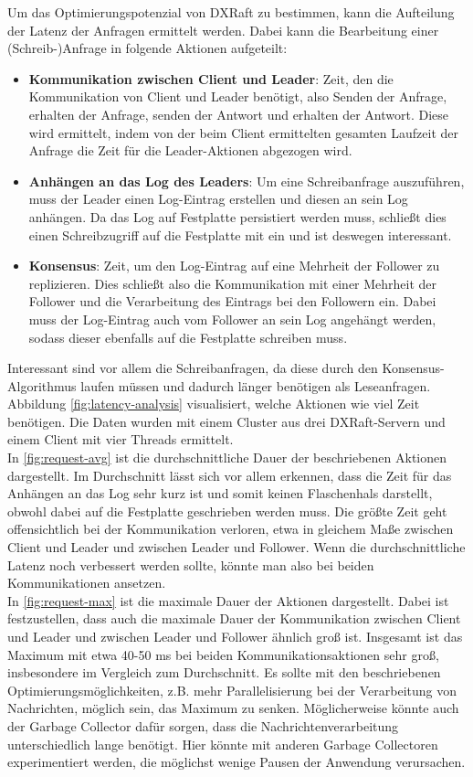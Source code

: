 Um das Optimierungspotenzial von DXRaft zu bestimmen, kann die Aufteilung der Latenz der Anfragen ermittelt werden. Dabei kann die Bearbeitung einer (Schreib-)Anfrage in folgende Aktionen aufgeteilt:
\begin{itemize}
	\item \textbf{Kommunikation zwischen Client und Leader}: Zeit, den die Kommunikation von Client und Leader benötigt, also Senden der Anfrage, erhalten der Anfrage, senden der Antwort und erhalten der Antwort. Diese wird ermittelt, indem von der beim Client ermittelten gesamten Laufzeit der Anfrage die Zeit für die Leader-Aktionen abgezogen wird.
	\item \textbf{Anhängen an das Log des Leaders}: Um eine Schreibanfrage auszuführen, muss der Leader einen Log-Eintrag erstellen und diesen an sein Log anhängen. Da das Log auf Festplatte persistiert werden muss, schließt dies einen Schreibzugriff auf die Festplatte mit ein und ist deswegen interessant.
	\item \textbf{Konsensus}: Zeit, um den Log-Eintrag auf eine Mehrheit der Follower zu replizieren. Dies schließt also die Kommunikation mit einer Mehrheit der Follower und die Verarbeitung des Eintrags bei den Followern ein. Dabei muss der Log-Eintrag auch vom Follower an sein Log angehängt werden, sodass dieser ebenfalls auf die Festplatte schreiben muss.
\end{itemize}

Interessant sind vor allem die Schreibanfragen, da diese durch den Konsensus-Algorithmus laufen müssen und dadurch länger benötigen als Leseanfragen. Abbildung \ref{fig:latency-analysis} visualisiert, welche Aktionen wie viel Zeit benötigen. Die Daten wurden mit einem Cluster aus drei DXRaft-Servern und einem Client mit vier Threads ermittelt. \\

In \ref{fig:request-avg} ist die durchschnittliche Dauer der beschriebenen Aktionen dargestellt. Im Durchschnitt lässt sich vor allem erkennen, dass die Zeit für das Anhängen an das Log sehr kurz ist und somit keinen Flaschenhals darstellt, obwohl dabei auf die Festplatte geschrieben werden muss. Die größte Zeit geht offensichtlich bei der Kommunikation verloren, etwa in gleichem Maße zwischen Client und Leader und zwischen Leader und Follower. Wenn die durchschnittliche Latenz noch verbessert werden sollte, könnte man also bei beiden Kommunikationen ansetzen. \\

In \ref{fig:request-max} ist die maximale Dauer der Aktionen dargestellt. Dabei ist festzustellen, dass auch die maximale Dauer der Kommunikation zwischen Client und Leader und zwischen Leader und Follower ähnlich groß ist. Insgesamt ist das Maximum mit etwa 40-50 ms bei beiden Kommunikationsaktionen sehr groß, insbesondere im Vergleich zum Durchschnitt. Es sollte mit den beschriebenen Optimierungsmöglichkeiten, z.B. mehr Parallelisierung bei der Verarbeitung von Nachrichten, möglich sein, das Maximum zu senken. Möglicherweise könnte auch der Garbage Collector dafür sorgen, dass die Nachrichtenverarbeitung unterschiedlich lange benötigt. Hier könnte mit anderen Garbage Collectoren experimentiert werden, die möglichst wenige Pausen der Anwendung verursachen.

